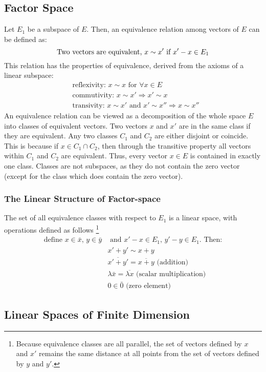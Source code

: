 \documentclass{article}
\begin{document}
\subsection{Factor Space}
Let \(E_1\) be a subspace of \(E\). Then, an equivalence relation among vectors of \(E\) can be defined as:
\begin{displaymath}
	\text{Two vectors are equivalent, }x\sim x'\text{ if }x'-x\in E_1\\
\end{displaymath}
This relation has the properties of equivalence, derived from the axioms of a linear subspace:
\begin{align*}
	&\text{reflexivity: }x\sim x\text{ for }\forall x\in E\\
	&\text{commutivity: }x\sim x'\Rightarrow x'\sim x\\
	&\text{transivity: }x\sim x'\text{ and }x'\sim x''\Rightarrow x\sim x''
\end{align*}
An equivalence relation can be viewed as a decomposition of the whole space \(E\) into classes of equivalent vectors. Two vectors \(x\) and \(x'\) are in the same class if they are equivalent. Any two classes \(C_1\) and \(C_2\) are either disjoint or coincide. This is because if \(x\in C_1\cap C_2\), then through the transitive property all vectors within \(C_1\) and \(C_2\) are equivalent. Thus, every vector \(x\in E\) is contained in exactly one class. Classes are not subspaces, as they do not contain the zero vector (except for the class which does contain the zero vector).
\subsubsection{The Linear Structure of Factor-space}
The set of all equivalence classes with respect to \(E_1\) is a linear space, with operations defined as follows
\footnote{Because equivalence classes are all parallel, the set of vectors defined by \(x\) and \(x'\) remains the same distance at all points from the set of vectors defined by \(y\) and \(y'\).}\\
\begin{align*}
	\text{define }x\in\bar{x}\text{, }y\in\bar{y}&\text{ and } x'-x\in E_1\text{, }y'-y\in E_1\text{. Then:}\\
	&x'+y'\sim x+y\\
	&\overline{x'+y'}=\overline{x+y}\text{ (addition)}\\
	&\lambda\bar{x}=\overline{\lambda x}\text{ (scalar multiplication)}\\
	&0\in\bar{0}\text{ (zero element)}
\end{align*}
\subsection{Linear Spaces of Finite Dimension}
\end{document}
